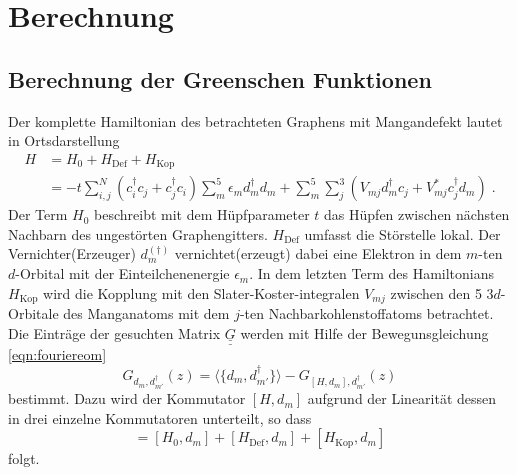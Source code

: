 \chapter{Berechnung}
\label{chap:berechnung}
\section{Berechnung der Greenschen Funktionen}
\label{sec:hamiltonian}
Der komplette Hamiltonian des betrachteten Graphens mit Mangandefekt lautet in Ortsdarstellung 
\begin{align}
   H &=  H_0 + H_\text{Def} + H_\text{Kop}\\
    &=- t \sum_{i,j}^N \left ( c_i^\dagger c_j + c_j^\dagger c_i \right ) \sum_m^5 \epsilon_m d_m^\dagger d_m
    + \sum_m^5 \sum_j^3 \left ( V_{mj} d_m^\dagger c_j + V^*_{mj} c_j^\dagger d_m  \right) \; \text{.} \label{eqn:full_Hamiltonian}
\end{align}
Der Term $H_0$ beschreibt mit dem Hüpfparameter $t$ das Hüpfen zwischen nächsten Nachbarn des ungestörten Graphengitters.
$H_\text{Def}$ umfasst die Störstelle lokal. Der Vernichter(Erzeuger) $d_m^{(\dagger)}$ vernichtet(erzeugt) dabei eine 
Elektron in dem $m$-ten $d$-Orbital mit der Einteilchenenergie $\epsilon_m$.
In dem letzten Term des Hamiltonians $H_\text{Kop}$ wird die Kopplung mit den Slater-Koster-integralen
$V_{mj}$ zwischen den 5 $3d$-Orbitale des Manganatoms mit dem $j$-ten Nachbarkohlenstoffatoms betrachtet.
Die Einträge der gesuchten Matrix $\underline{\underline{G}}$ werden mit Hilfe der Bewegunsgleichung \eqref{eqn:fouriereom} 
\begin{equation*}
    G_{d_m, d_{m'}^\dagger}(z) = \langle \{ d_m, d_{m'}^\dagger \} \rangle - G_{[H,d_m], d_{m'}^\dagger} (z)
\end{equation*}
bestimmt.
Dazu wird der Kommutator $[H,d_m]$ aufgrund der Linearität dessen in drei einzelne Kommutatoren unterteilt, so dass 
\begin{equation*}
    [H,d_m] = [H_0,d_m] + [H_\text{Def},d_m] +[H_\text{Kop},d_m] 
\end{equation*}
folgt. 